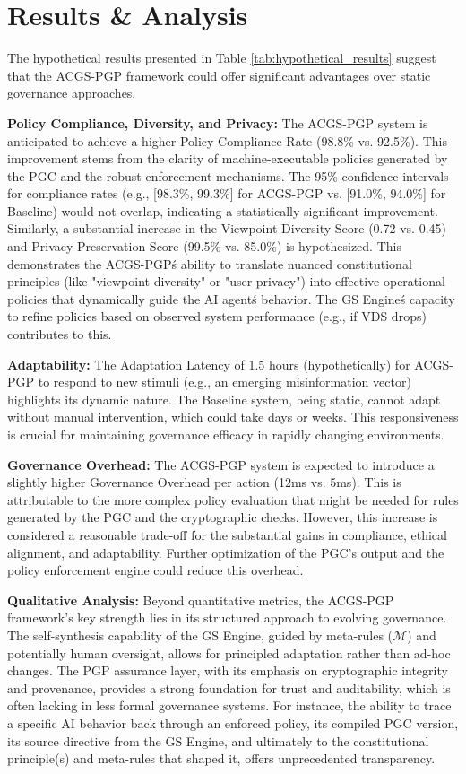 \documentclass[sigconf,review,screen]{acmart}
\begin{document}
\section{Results \& Analysis}
The hypothetical results presented in Table \ref{tab:hypothetical_results} suggest that the ACGS-PGP framework could offer significant advantages over static governance approaches.

\textbf{Policy Compliance, Diversity, and Privacy:} The ACGS-PGP system is anticipated to achieve a higher Policy Compliance Rate (98.8\% vs. 92.5\%). This improvement stems from the clarity of machine-executable policies generated by the PGC and the robust enforcement mechanisms. The 95\% confidence intervals for compliance rates (e.g., [98.3\%, 99.3\%] for ACGS-PGP vs. [91.0\%, 94.0\%] for Baseline) would not overlap, indicating a statistically significant improvement. Similarly, a substantial increase in the Viewpoint Diversity Score (0.72 vs. 0.45) and Privacy Preservation Score (99.5\% vs. 85.0\%) is hypothesized. This demonstrates the ACGS-PGP\'s ability to translate nuanced constitutional principles (like "viewpoint diversity" or "user privacy") into effective operational policies that dynamically guide the AI agent\'s behavior. The GS Engine\'s capacity to refine policies based on observed system performance (e.g., if VDS drops) contributes to this.

\textbf{Adaptability:} The Adaptation Latency of 1.5 hours (hypothetically) for ACGS-PGP to respond to new stimuli (e.g., an emerging misinformation vector) highlights its dynamic nature. The Baseline system, being static, cannot adapt without manual intervention, which could take days or weeks. This responsiveness is crucial for maintaining governance efficacy in rapidly changing environments.

\textbf{Governance Overhead:} The ACGS-PGP system is expected to introduce a slightly higher Governance Overhead per action (12ms vs. 5ms). This is attributable to the more complex policy evaluation that might be needed for rules generated by the PGC and the cryptographic checks. However, this increase is considered a reasonable trade-off for the substantial gains in compliance, ethical alignment, and adaptability. Further optimization of the PGC's output and the policy enforcement engine could reduce this overhead.

\textbf{Qualitative Analysis:} Beyond quantitative metrics, the ACGS-PGP framework's key strength lies in its structured approach to evolving governance. The self-synthesis capability of the GS Engine, guided by meta-rules ($\mathcal{M}$) and potentially human oversight, allows for principled adaptation rather than ad-hoc changes. The PGP assurance layer, with its emphasis on cryptographic integrity and provenance, provides a strong foundation for trust and auditability, which is often lacking in less formal governance systems. For instance, the ability to trace a specific AI behavior back through an enforced policy, its compiled PGC version, its source directive from the GS Engine, and ultimately to the constitutional principle(s) and meta-rules that shaped it, offers unprecedented transparency.
\end{document}
